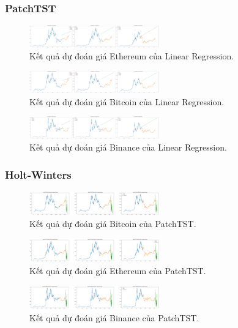 \documentclass[conference]{IEEEtran}
\begin{document}
\subsubsection{PatchTST}

\begin{figure}[H]
    \centering
    \includegraphics[width=0.5\textwidth]{bibliography/pictures/LinearRegression_ETH.png}
    \caption{Kết quả dự đoán giá Ethereum của Linear Regression.}
\end{figure}
\begin{figure}[H]
    \centering
    \includegraphics[width=0.5\textwidth]{bibliography/pictures/LinearRegression_BTC.png}
    \caption{Kết quả dự đoán giá Bitcoin của Linear Regression.}
\end{figure}
\begin{figure}[H]
    \centering
    \includegraphics[width=0.5\textwidth]{bibliography/pictures/LinearRegression_BNB.png}
    \caption{Kết quả dự đoán giá Binance của Linear Regression.}
\end{figure}



\subsubsection{Holt-Winters}

\begin{figure}[H]
    \centering
    \includegraphics[width=0.5\textwidth]{bibliography/Figure/PatchTST_BTC_90.png}
    \caption{Kết quả dự đoán giá Bitcoin của PatchTST.}
\end{figure}
\begin{figure}[H]
    \centering
    \includegraphics[width=0.5\textwidth]{bibliography/Figure/PatchTST_ETH_90.png}
    \caption{Kết quả dự đoán giá Ethereum của PatchTST.}
\end{figure}
\begin{figure}[H]
    \centering
    \includegraphics[width=0.5\textwidth]{bibliography/Figure/PatchTST_BNB_90.png}
    \caption{Kết quả dự đoán giá Binance của PatchTST.}
\end{figure}
\end{document}
